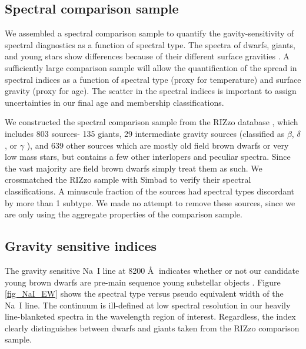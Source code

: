 \documentclass[12pt,preprint]{aastex}
\newcommand{\angstrom}{\mbox{\normalfont\AA}}
\begin{document}
\subsection{Spectral comparison sample}
We assembled a spectral comparison sample to quantify the gavity-sensitivity of spectral diagnostics as a function of spectral type.  The spectra of dwarfs, giants, and young stars show differences because of their different surface gravities \citep{2012AJ....143..114S}.  A sufficiently large comparison sample will allow the quantification of the spread in spectral indices as a function of spectral type (proxy for temperature) and surface gravity (proxy for age).  The scatter in the spectral indices is important to assign uncertainties in our final age and membership classifications.

We constructed the spectral comparison sample from the RIZzo database \citep{cruz_kelle_2014_10721}, which includes 803 sources- 135 giants, 29 intermediate gravity sources (classified as $\beta$, $\delta$, or $\gamma$ \citep{2009AJ....137.3345C}), and 639 other sources which are mostly old field brown dwarfs or very low mass stars, but contains a few other interlopers and peculiar spectra.  Since the vast majority are field brown dwarfs simply treat them as such.  We crossmatched the RIZzo sample with Simbad to verify their spectral classifications.  A minuscule fraction of the sources had spectral types discordant by more than 1 subtype.  We made no attempt to remove these sources, since we are only using the aggregate properties of the comparison sample.

\subsection{Gravity sensitive indices}
The gravity sensitive Na~I line at 8200 \angstrom$\;$ indicates whether or not our candidate young brown dwarfs are pre-main sequence young substellar objects \citep{1999ApJ...525..466L, 2007AJ....134.2398C, 2009AJ....137.3345C}.  Figure \ref{fig_NaI_EW} shows the spectral type versus pseudo equivalent width of the Na~I line.  The continuum is ill-defined at low spectral resolution in our heavily line-blanketed spectra in the wavelength region of interest.  Regardless, the index clearly distinguishes between dwarfs and giants taken from the RIZzo comparison sample.
\end{document}

